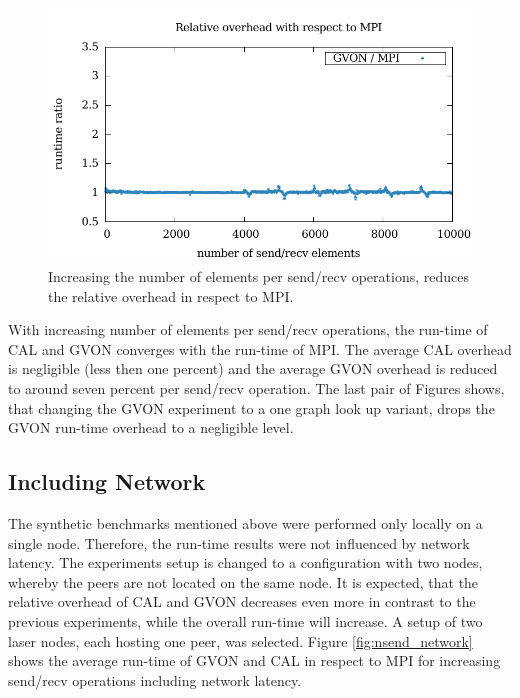 \begin{figure}[H]
\begin{minipage}[t]{0.5\textwidth}
    \includegraphics[width=\textwidth]{plots/50_nsize_one_lookup_overhead_gvon_laser}
  \end{minipage}%
  \caption{Increasing the number of elements per send/recv operations,
    reduces the relative overhead in respect to MPI.}
  \label{fig:nsize_kepler}
\end{figure}

\noindent With increasing number of elements per send/recv operations,
the run-time of CAL and GVON converges with the run-time of MPI. The
average CAL overhead is negligible (less then one percent) and the average
GVON overhead is reduced to around seven percent per send/recv operation. The
last pair of Figures shows, that changing the GVON experiment to a one
graph look up variant, drops the GVON run-time overhead to a
negligible level.

\subsection*{Including Network}
The synthetic benchmarks mentioned above were performed only locally on a single node.
Therefore, the run-time results were not influenced by network latency.
The experiments setup is changed to a configuration with two
nodes, whereby the peers are not located on the same node. It is
expected, that the relative overhead of CAL and GVON decreases even
more in contrast to the previous experiments, while the overall
run-time will increase.  A setup of two laser nodes, each hosting one
peer, was selected.  Figure \ref{fig:nsend_network} shows the average
run-time of GVON and CAL in respect to MPI for increasing send/recv
operations including network latency.

